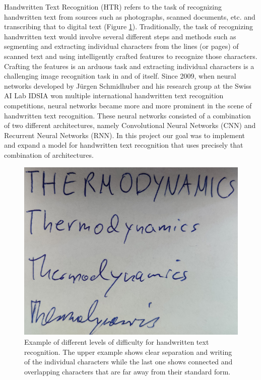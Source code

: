 \documentclass{article}
\begin{document}
Handwritten Text Recognition (HTR) refers to the task of recognizing handwritten text from sources such as photographs, scanned documents, etc. and transcribing that to digital text (Figure \ref{fig:SampleData}).
Traditionally, the task of recognizing handwritten text would involve several different steps and methods such as segmenting and extracting individual characters from the lines (or pages) of scanned text and using intelligently crafted features to recognize those characters. Crafting the features is an arduous task and extracting individual characters is a challenging image recognition task in and of itself. Since 2009, when neural networks developed by J\"urgen Schmidhuber and his research group at the Swiss AI Lab IDSIA won multiple international handwritten text recognition competitions\cite{Angelica}, neural networks became more and more prominent in the scene of handwritten text recognition. These neural networks consisted of a combination of two different architectures, namely Convolutional Neural Networks (CNN) and Recurrent Neural Networks (RNN). In this project our goal was to implement and expand a model for handwritten text recognition that uses precisely that combination of architectures. 
\begin{figure}[h]
\begin{center}
\includegraphics[scale=0.4]{text_example2}
\end{center}
\caption{Example of different levels of difficulty for handwritten text recognition. The upper example shows clear separation and writing of the individual characters while the last one shows connected and overlapping characters that are far away from their standard form.}
\label{fig:SampleData}
\end{figure}
\end{document}
